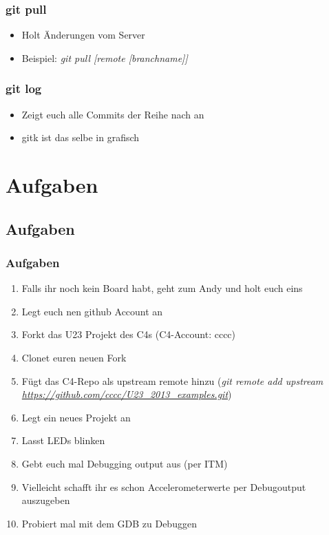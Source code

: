 \documentclass[ngerman,compress]{beamer}
\begin{document}
\begin{frame}
	\frametitle{git pull}
	\begin{itemize}
		\item Holt Änderungen vom Server
		\item Beispiel: \emph{git pull [remote [branchname]]}
	\end{itemize}
\end{frame}

\begin{frame}
	\frametitle{git log}
	\begin{itemize}
		\item Zeigt euch alle Commits der Reihe nach an
		\item gitk ist das selbe in grafisch
	\end{itemize}
\end{frame}

\section{Aufgaben}
\subsection{Aufgaben}
\begin{frame}
	\frametitle{Aufgaben}
	\begin{enumerate}
		\item Falls ihr noch kein Board habt, geht zum Andy und holt euch eins
		\item Legt euch nen github Account an
		\item Forkt das U23 Projekt des C4s (C4-Account: cccc)
		\item Clonet euren neuen Fork
		\item Fügt das C4-Repo als upstream remote hinzu (\emph{git remote add upstream \url{https://github.com/cccc/U23_2013_examples.git}})
		\item Legt ein neues Projekt an
		\item Lasst LEDs blinken
		\item Gebt euch mal Debugging output aus (per ITM)
		\item Vielleicht schafft ihr es schon Accelerometerwerte per Debugoutput auszugeben
		\item Probiert mal mit dem GDB zu Debuggen
	\end{enumerate}
\end{frame}
\end{document}
